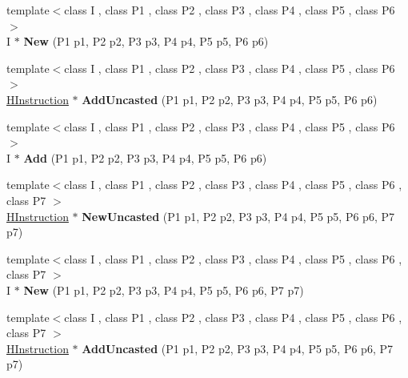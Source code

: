 \begin{DoxyCompactItemize}
\item 
\hypertarget{classv8_1_1internal_1_1_h_graph_builder_a610fa47d77c385921e3b3169d7834d6e}{}{\footnotesize template$<$class I , class P1 , class P2 , class P3 , class P4 , class P5 , class P6 $>$ }\\I $\ast$ {\bfseries New} (P1 p1, P2 p2, P3 p3, P4 p4, P5 p5, P6 p6)\label{classv8_1_1internal_1_1_h_graph_builder_a610fa47d77c385921e3b3169d7834d6e}

\item 
\hypertarget{classv8_1_1internal_1_1_h_graph_builder_acbd23499ba4112eb9334a42f2b2f9613}{}{\footnotesize template$<$class I , class P1 , class P2 , class P3 , class P4 , class P5 , class P6 $>$ }\\\hyperlink{classv8_1_1internal_1_1_h_instruction}{H\+Instruction} $\ast$ {\bfseries Add\+Uncasted} (P1 p1, P2 p2, P3 p3, P4 p4, P5 p5, P6 p6)\label{classv8_1_1internal_1_1_h_graph_builder_acbd23499ba4112eb9334a42f2b2f9613}

\item 
\hypertarget{classv8_1_1internal_1_1_h_graph_builder_a1b9325be14c1a3c406f12bc8c311b5a4}{}{\footnotesize template$<$class I , class P1 , class P2 , class P3 , class P4 , class P5 , class P6 $>$ }\\I $\ast$ {\bfseries Add} (P1 p1, P2 p2, P3 p3, P4 p4, P5 p5, P6 p6)\label{classv8_1_1internal_1_1_h_graph_builder_a1b9325be14c1a3c406f12bc8c311b5a4}

\item 
\hypertarget{classv8_1_1internal_1_1_h_graph_builder_af4d9a5f99ae44c76f79e69b3f372132a}{}{\footnotesize template$<$class I , class P1 , class P2 , class P3 , class P4 , class P5 , class P6 , class P7 $>$ }\\\hyperlink{classv8_1_1internal_1_1_h_instruction}{H\+Instruction} $\ast$ {\bfseries New\+Uncasted} (P1 p1, P2 p2, P3 p3, P4 p4, P5 p5, P6 p6, P7 p7)\label{classv8_1_1internal_1_1_h_graph_builder_af4d9a5f99ae44c76f79e69b3f372132a}

\item 
\hypertarget{classv8_1_1internal_1_1_h_graph_builder_a3fc0a007550890edb1b3cd59a1aacb75}{}{\footnotesize template$<$class I , class P1 , class P2 , class P3 , class P4 , class P5 , class P6 , class P7 $>$ }\\I $\ast$ {\bfseries New} (P1 p1, P2 p2, P3 p3, P4 p4, P5 p5, P6 p6, P7 p7)\label{classv8_1_1internal_1_1_h_graph_builder_a3fc0a007550890edb1b3cd59a1aacb75}

\item 
\hypertarget{classv8_1_1internal_1_1_h_graph_builder_aa718fe1dc95a7444fa2107df39686b67}{}{\footnotesize template$<$class I , class P1 , class P2 , class P3 , class P4 , class P5 , class P6 , class P7 $>$ }\\\hyperlink{classv8_1_1internal_1_1_h_instruction}{H\+Instruction} $\ast$ {\bfseries Add\+Uncasted} (P1 p1, P2 p2, P3 p3, P4 p4, P5 p5, P6 p6, P7 p7)\label{classv8_1_1internal_1_1_h_graph_builder_aa718fe1dc95a7444fa2107df39686b67}


\end{DoxyCompactItemize}

